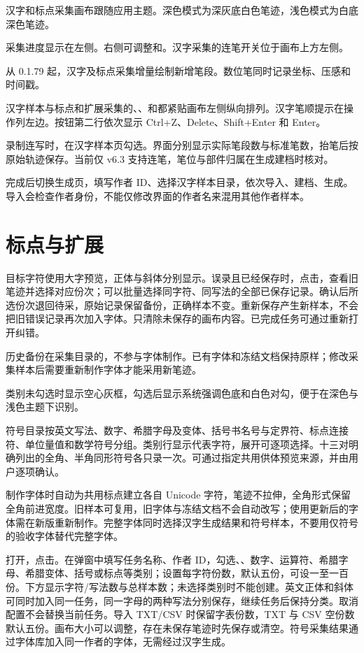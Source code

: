 汉字和标点采集画布跟随应用主题。深色模式为深灰底白色笔迹，浅色模式为白底深色笔迹。

采集进度显示在左侧。右侧可调整和。汉字采集的连笔开关位于画布上方左侧。

从 0.1.79 起，汉字及标点采集增量绘制新增笔段。数位笔同时记录坐标、压感和时间戳。

汉字样本与标点和扩展采集的、、和都紧贴画布左侧纵向排列。汉字笔顺提示在操作列左边。按钮第二行依次显示 Ctrl+Z、Delete、Shift+Enter 和 Enter。

录制连写时，在汉字样本页勾选。界面分别显示实际笔段数与标准笔数，抬笔后按原始轨迹保存。当前仅 v6.3 支持连笔，笔位与部件归属在生成建档时核对。

完成后切换生成页，填写作者 ID、选择汉字样本目录，依次导入、建档、生成。导入会检查作者身份，不能仅修改界面的作者名来混用其他作者样本。

\section{标点与扩展}
目标字符使用大字预览，正体与斜体分别显示。误录且已经保存时，点击，查看旧笔迹并选择对应份次；可以批量选择同字符、同写法的全部已保存记录。确认后所选份次退回待采，原始记录保留备份，正确样本不变。重新保存产生新样本，不会把旧错误记录再次加入字体。只清除未保存的画布内容。已完成任务可通过重新打开纠错。

历史备份在采集目录的，不参与字体制作。已有字体和冻结文档保持原样；修改采集样本后需要重新制作字体才能采用新笔迹。

类别未勾选时显示空心灰框，勾选后显示系统强调色底和白色对勾，便于在深色与浅色主题下识别。

符号目录按英文写法、数字、希腊字母及变体、括号书名号与定界符、标点连接符、单位量值和数学符号分组。类别行显示代表字符，展开可逐项选择。十三对明确列出的全角、半角同形符号各只录一次。可通过指定共用供体预览来源，并由用户逐项确认。

制作字体时自动为共用标点建立各自 Unicode 字符，笔迹不拉伸，全角形式保留全角前进宽度。旧样本可复用，旧字体与冻结文档不会自动改写；使用更新后的字体需在新版重新制作。完整字体同时选择汉字生成结果和符号样本，不要用仅符号的验收字体替代完整字体。

打开，点击。在弹窗中填写任务名称、作者 ID，勾选、、数字、运算符、希腊字母、希腊变体、括号或标点等类别；设置每字符份数，默认五份，可设一至一百份。下方显示字符/写法数与总样本数；未选择类别时不能创建。英文正体和斜体可同时加入同一任务，同一字母的两种写法分别保存，继续任务后保持分类。取消配置不会替换当前任务。导入 TXT/CSV 时保留字表份数，TXT 与 CSV 空份数默认五份。画布大小可以调整，存在未保存笔迹时先保存或清空。符号采集结果通过字体库加入同一作者的字体，无需经过汉字生成。

